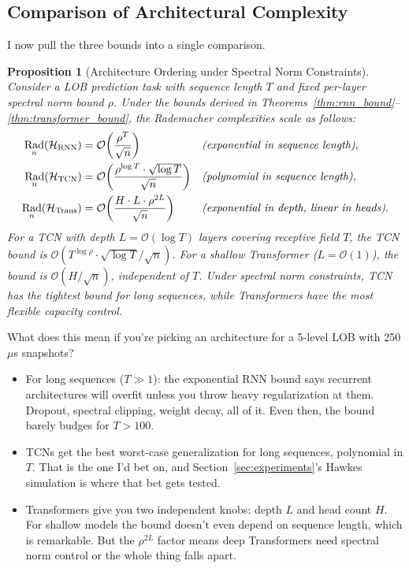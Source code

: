 \documentclass[11pt]{article}
\newtheorem{proposition}[theorem]{Proposition}
\theoremstyle{definition}
\theoremstyle{remark}
\newcommand{\cH}{\mathcal{H}}
\newcommand{\cO}{\mathcal{O}}
\DeclareMathOperator{\Rad}{Rad}
\begin{document}
\subsection{Comparison of Architectural Complexity}\label{sec:theory:comparison}

I now pull the three bounds into a single comparison.

\begin{proposition}[Architecture Ordering under Spectral Norm Constraints]\label{prop:ordering}
Consider a LOB prediction task with sequence length $T$ and fixed per-layer spectral norm bound $\rho$.
Under the bounds derived in Theorems~\ref{thm:rnn_bound}--\ref{thm:transformer_bound}, the Rademacher complexities scale as follows:
\begin{align}
    \Rad_n(\cH_{\mathrm{RNN}}) &= \cO\!\left(\frac{\rho^T}{\sqrt{n}}\right) && \text{\emph{(exponential in sequence length)}}, \label{eq:rnn_scaling} \\
    \Rad_n(\cH_{\mathrm{TCN}}) &= \cO\!\left(\frac{\rho^{\log T} \cdot \sqrt{\log T}}{\sqrt{n}}\right) && \text{\emph{(polynomial in sequence length)}}, \label{eq:tcn_scaling} \\
    \Rad_n(\cH_{\mathrm{Trans}}) &= \cO\!\left(\frac{H \cdot L \cdot \rho^{2L}}{\sqrt{n}}\right) && \text{\emph{(exponential in depth, linear in heads)}}. \label{eq:trans_scaling}
\end{align}
For a TCN with depth $L = \cO(\log T)$ layers covering receptive field $T$, the TCN bound is $\cO(T^{\log \rho} \cdot \sqrt{\log T} / \sqrt{n})$.
For a shallow Transformer ($L = \cO(1)$), the bound is $\cO(H / \sqrt{n})$, independent of $T$.
Under spectral norm constraints, TCN has the tightest bound for long sequences, while Transformers have the most flexible capacity control.
\end{proposition}

What does this mean if you're picking an architecture for a 5-level LOB with 250$\mu$s snapshots?
\begin{itemize}
    \item For long sequences ($T \gg 1$): the exponential RNN bound says recurrent architectures will overfit unless you throw heavy regularization at them.
    Dropout, spectral clipping, weight decay, all of it.
    Even then, the bound barely budges for $T > 100$.
    \item TCNs get the best worst-case generalization for long sequences, polynomial in $T$.
    That is the one I'd bet on, and Section~\ref{sec:experiments}'s Hawkes simulation is where that bet gets tested.
    \item Transformers give you two independent knobs: depth $L$ and head count $H$.
    For shallow models the bound doesn't even depend on sequence length, which is remarkable.
    But the $\rho^{2L}$ factor means deep Transformers need spectral norm control or the whole thing falls apart.
\end{itemize}
\end{document}
